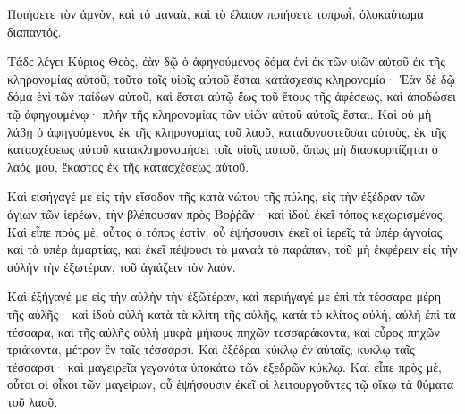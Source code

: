 {Ποιήσετε τὸν ἀμνὸν, καὶ τὸ μαναὰ, καὶ τὸ ἔλαιον ποιήσετε τοπρωῒ, ὁλοκαύτωμα διαπαντός.
\par }{\PP {}Τάδε λέγει Κύριος Θεὸς, ἐὰν δῷ ὁ ἀφηγούμενος δόμα ἑνὶ ἐκ τῶν υἱῶν αὐτοῦ ἐκ τῆς κληρονομίας αὐτοῦ, τοῦτο τοῖς υἱοῖς αὐτοῦ ἔσται κατάσχεσις κληρονομία·
Ἐὰν δὲ δῷ δόμα ἑνὶ τῶν παίδων αὐτοῦ, καὶ ἔσται αὐτῷ ἕως τοῦ ἔτους τῆς ἀφέσεως, καὶ ἀποδώσει τῷ ἀφηγουμένῳ· πλὴν τῆς κληρονομίας τῶν υἱῶν αὐτοῦ αὐτοῖς ἔσται.
Καὶ οὐ μὴ λάβῃ ὁ ἀφηγούμενος ἐκ τῆς κληρονομίας τοῦ λαοῦ, καταδυναστεῦσαι αὐτοὺς, ἐκ τῆς κατασχέσεως αὐτοῦ κατακληρονομήσει τοῖς υἱοῖς αὐτοῦ, ὅπως μὴ διασκορπίζηται ὁ λαός μου, ἕκαστος ἐκ τῆς κατασχέσεως αὐτοῦ.
\par }{\PP {}Καὶ εἰσήγαγέ με εἰς τὴν εἴσοδον τῆς κατὰ νώτου τῆς πύλης, εἰς τὴν ἐξέδραν τῶν ἁγίων τῶν ἱερέων, τὴν βλέπουσαν πρὸς Βοῤῥᾶν· καὶ ἰδοὺ ἐκεῖ τόπος κεχωρισμένος.
Καὶ εἶπε πρὸς μὲ, οὗτος ὁ τόπος ἐστὶν, οὗ ἑψήσουσιν ἐκεῖ οἱ ἱερεῖς τὰ ὑπὲρ ἀγνοίας καὶ τὰ ὑπὲρ ἁμαρτίας, καὶ ἐκεῖ πέψουσι τὸ μαναὰ τὸ παράπαν, τοῦ μὴ ἐκφέρειν εἰς τὴν αὐλὴν τὴν ἐξωτέραν, τοῦ ἁγιάζειν τὸν λαόν.
\par }{\PP {}Καὶ ἐξήγαγέ με εἰς τὴν αὐλὴν τὴν ἐξῶτέραν, καὶ περιήγαγέ με ἐπὶ τὰ τέσσαρα μέρη τῆς αὐλῆς· καὶ ἰδοὺ αὐλὴ κατὰ τὰ κλίτη τῆς αὐλῆς,
κατὰ τὸ κλίτος αὐλὴ, αὐλὴ ἐπὶ τὰ τέσσαρα, καὶ τῆς αὐλῆς αὐλὴ μικρὰ μήκους πηχῶν τεσσαράκοντα, καὶ εὖρος πηχῶν τριάκοντα, μέτρον ἓν ταῖς τέσσαρσι.
Καὶ ἐξέδραι κύκλῳ ἐν αὐταῖς, κυκλῳ ταῖς τέσσαρσι· καὶ μαγειρεῖα γεγονότα ὑποκάτω τῶν ἐξεδρῶν κύκλῳ.
Καὶ εἶπε πρὸς μὲ, οὗτοι οἱ οἶκοι τῶν μαγείρων, οὗ ἑψήσουσιν ἐκεῖ οἱ λειτουργοῦντες τῷ οἴκῳ τὰ θύματα τοῦ λαοῦ.

}
